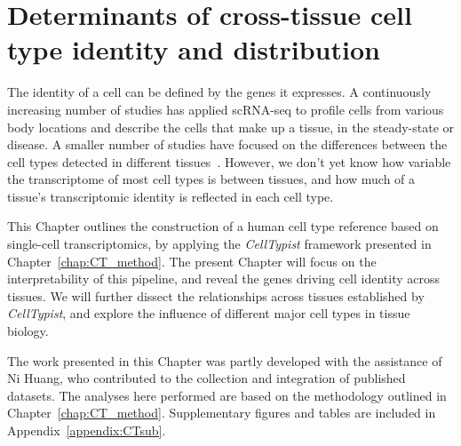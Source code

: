 \chapter{Determinants of cross-tissue cell type identity and distribution} \label{chap:CT_bio}

\ifpdf
    \graphicspath{{Chapter4/Figs/Raster/}{Chapter4/Figs/PDF/}{Chapter4/Figs/}}
\else
    \graphicspath{{Chapter4/Figs/Vector/}{Chapter4/Figs/}}
\fi
The identity of a cell can be defined by the genes it expresses. A continuously increasing number of studies has applied scRNA-seq to profile cells from various body locations and describe the cells that make up a tissue, in the steady-state or disease. A smaller number of studies have focused on the differences between the cell types detected in different tissues~\citep{miragaia_single-cell_2019,scott_transcription_2018}. However, we don't yet know how variable the transcriptome of most cell types is between tissues, and how much of a tissue's transcriptomic identity is reflected in each cell type.

This Chapter outlines the construction of a human cell type reference based on single-cell transcriptomics, by applying the \textit{CellTypist} framework presented in Chapter~\ref{chap:CT_method}. The present Chapter will focus on the interpretability of this pipeline, and reveal the genes driving cell identity across tissues. We will further dissect the relationships across tissues established by \textit{CellTypist}, and explore the influence of different major cell types in tissue biology.

The work presented in this Chapter was partly developed with the assistance of Ni Huang, who contributed to the collection and integration of published datasets. The analyses here performed are based on the methodology outlined in Chapter~\ref{chap:CT_method}. Supplementary figures and tables are included in Appendix~\ref{appendix:CTsub}.


